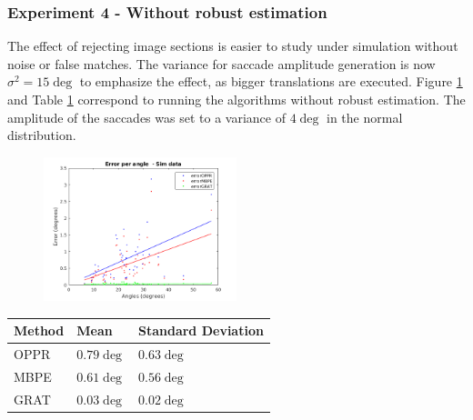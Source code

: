 \subsubsection{Experiment 4 - Without robust estimation}
The effect of rejecting image sections is easier to study under simulation without noise or false matches. The variance for saccade amplitude generation is now $\sigma^2 = 15 \deg $ to emphasize the effect, as bigger translations are executed. Figure \ref{cha5:sec1:withoutr} and Table \ref{cha5:sec1:withoutrt} correspond to running the algorithms without robust estimation. The amplitude of the saccades was set to a variance of $4 \deg$ in the normal distribution.\\

\begin{figure}
	\centering
	\includegraphics[width=0.5\textwidth]{images/withoutransac.png}
	\label{cha5:sec1:withoutr}
\end{figure}
\begin{table}
\begin{tabular}{| l | l | l |}
	\hline
	Method & Mean & Standard Deviation \\
	\hline
	OPPR &  $0.79 \deg$ & $0.63 \deg$ \\
	\hline
	MBPE &  $0.61 \deg$ & $0.56 \deg$ \\
	\hline
	GRAT &  $0.03 \deg$ & $0.02 \deg$ \\ 
	\hline
\end{tabular}
\label{cha5:sec1:withoutrt}
\end{table}

